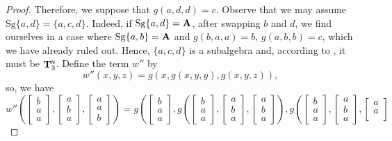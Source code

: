 \documentclass[11pt]{amsart}
\newcommand{\m}[1]{\mathbf{\uppercase{#1}}}
\theoremstyle{definition}
\theoremstyle{remark}
\theoremstyle{plain}
\begin{document}
\begin{enumerate}[wide, labelindent=0pt]
\begin{proof}
Therefore, we suppose that $g(a,d,d)=c$. Observe that we may assume $\mathrm{Sg}\{a,d\}=\{a,c,d\}$. Indeed, if $\mathrm{Sg}\{a,d\}=\m a$, after swapping $b$ and $d$, we find ourselves in a case where $\mathrm{Sg}\{a,b\} = \m a$ and $g(b,a,a) = b$, $g(a,b,b) = c$, which we have already ruled out. Hence, $\{a,c,d\}$ is a subalgebra and, according to , it must be $\m t_3^{\scriptscriptstyle{\mathsf{N}}}$. Define the term $w''$ by $$w''(x,y,z)=g(x,g(x,y,y),g(x,y,z)),$$ so, we have 
 \begin{equation*}
w''\left(
\begin{bmatrix}
b \\
a \\
a
\end{bmatrix}\!,\!
\begin{bmatrix}
a \\
b \\
a
\end{bmatrix}\!,\!
\begin{bmatrix}
a \\
a \\
b
\end{bmatrix}
\right)=
g\left(
\begin{bmatrix}
b \\
a \\
a
\end{bmatrix}\!,\!
g\left(
\begin{bmatrix}
b \\
a \\
a
\end{bmatrix}\!,\!
\begin{bmatrix}
a \\
b \\
a
\end{bmatrix}\!,\!
\begin{bmatrix}
a \\
b \\
a
\end{bmatrix}
\right)\!,\!
g\left(
\begin{bmatrix}
b \\
a \\
a
\end{bmatrix}\!,\!
\begin{bmatrix}
a \\
b \\
a
\end{bmatrix}\!,\!
\begin{bmatrix}
a \\
a \\

\end{bmatrix}
\end{equation*}
\end{proof}
\end{enumerate}
\end{document}
